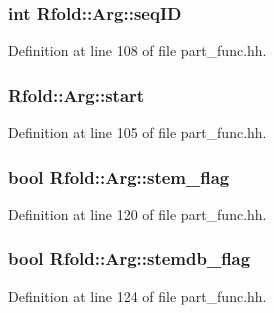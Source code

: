 \hypertarget{class_rfold_1_1_arg_a7e5e99f9fa61d2b7fe2d03d212f075d3}{
\subsubsection[{seq\+I\+D}]{\setlength{\rightskip}{0pt plus 5cm}int Rfold\+::\+Arg\+::seq\+I\+D}}\label{class_rfold_1_1_arg_a7e5e99f9fa61d2b7fe2d03d212f075d3}


Definition at line 108 of file part\+\_\+func.\+hh.

\hypertarget{class_rfold_1_1_arg_afe6c58f953e12b4964a7c14b78ee731e}{
\subsubsection[{start}]{ Rfold\+::\+Arg\+::start}}\label{class_rfold_1_1_arg_afe6c58f953e12b4964a7c14b78ee731e}


Definition at line 105 of file part\+\_\+func.\+hh.

\hypertarget{class_rfold_1_1_arg_aa67a67820097b91b6376581ae28ee481}{
\subsubsection[{stem\+\_\+flag}]{\setlength{\rightskip}{0pt plus 5cm}bool Rfold\+::\+Arg\+::stem\+\_\+flag}}\label{class_rfold_1_1_arg_aa67a67820097b91b6376581ae28ee481}


Definition at line 120 of file part\+\_\+func.\+hh.

\hypertarget{class_rfold_1_1_arg_ad5d34ff788f8795f1e75f313dd67c79e}{
\subsubsection[{stemdb\+\_\+flag}]{\setlength{\rightskip}{0pt plus 5cm}bool Rfold\+::\+Arg\+::stemdb\+\_\+flag}}\label{class_rfold_1_1_arg_ad5d34ff788f8795f1e75f313dd67c79e}


Definition at line 124 of file part\+\_\+func.\+hh.

